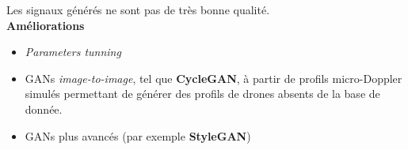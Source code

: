 \documentclass[a0,portrait]{a0poster}
\begin{document}
\begin{multicols}{2}
\begin{tcolorbox}[colback=blue!5!white,colframe=blue!75!black,title,title={\section*{Résultats}}]
\begin{center}
\end{center}
\begin{center}
\end{center}
\end{tcolorbox}
\bigskip


\begin{tcolorbox}[colback=red!5!orange,colframe=red!75!black,title={\section*{Perspectives}}]
Les signaux générés ne sont pas de très bonne qualité.\\
\textbf{Améliorations}
\begin{itemize}
    \item \textit{Parameters tunning}
    \item GANs \textit{image-to-image}, tel que \textbf{CycleGAN}, à partir de profils micro-Doppler simulés permettant de générer des profils de drones absents de la base de donnée.
    \item GANs plus avancés (par exemple \textbf{StyleGAN})
\end{itemize}
\end{tcolorbox}

\end{multicols}
\end{document}
